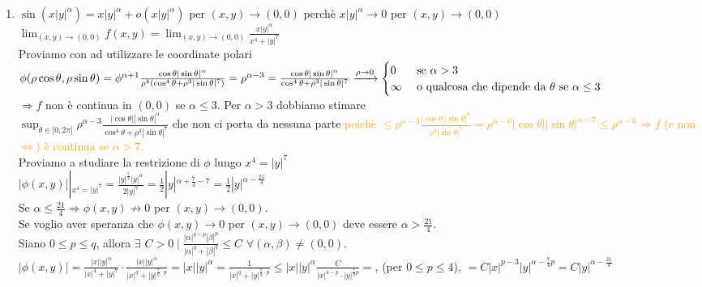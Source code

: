\documentclass{article}
\begin{document}
\begin{enumerate}
    \item $\sin(x|y|^\alpha)=x|y|^\alpha+o(x|y|^\alpha)$ per $(x,y)\rightarrow (0,0)$ perchè $x|y|^\alpha \rightarrow 0 $ per $(x,y)\rightarrow (0,0)$\\
    $\lim_{(x,y)\rightarrow(0,0)}f(x,y)=\lim_{(x,y)\rightarrow(0,0)}\frac{x|y|^\alpha}{x^4+|y|^7}$\\
    Proviamo con ad utilizzare le coordinate polari \\
    $\phi(\rho\cos\theta,\rho\sin\theta)=\phi^{\alpha+1}\frac{\cos\theta|\sin \theta|^\alpha}{\rho^4(\cos^4\theta+\rho^3|\sin\theta|^7)}=\rho^{\alpha-3}=\frac{\cos\theta|\sin\theta|^\alpha}{\cos^4\theta+\rho^3|\sin\theta|^7} \\
    \xrightarrow{\rho \rightarrow 0} \begin{cases}
        0& \text{  se  } \alpha > 3\\ 
        \infty& \text{  o qualcosa che dipende da }\theta \text{  se  } \alpha \leq 3
     \end{cases}$\\
     $\Rightarrow f$ non è continua in $(0,0)$ se $\alpha \leq 3$. Per $\alpha > 3 $ dobbiamo stimare\\
     $\sup_{\theta \in [0,2\pi[}\rho^{\alpha-3}\frac{|\cos\theta||\sin\theta|^\alpha}{\cos^4\theta+\rho^3|\sin\theta|^7}$ che non ci porta da nessuna parte \textcolor{orange}{poichè $\leq \rho^{\alpha-3}\frac{|\cos\theta||\sin\theta|^\alpha}{\rho^3|\sin\theta|^7}=\rho^{\alpha-6}|\cos\theta||\sin\theta|^{\alpha-7}\leq \rho^{\alpha-6}\Rightarrow f$ (e non $\Leftrightarrow$) è continua se $\alpha>7$.}\\
     Proviamo a studiare la restrizione di $\phi$ lungo $x^4 =|y|^7$\\
     $|\phi(x,y)||_{x^4=|y|^7} = \frac{|y|^{\frac{7}{4}} |y|^\alpha}{2|y|^7}=\frac{1}{2}|y|^{\alpha +\frac{7}{4}-7}=\frac{1}{2}|y|^{\alpha-\frac{21}{4}}$\\
     Se $\alpha \leq \frac{21}{4} \Rightarrow \phi(x,y) \nrightarrow 0$ per $(x,y)\rightarrow(0,0)$.\\
     Se voglio aver speranza che $\phi(x,y)\rightarrow 0$ per $(x,y)\rightarrow(0,0)$ deve essere $\alpha > \frac{21}{4}$.\\
     Siano $0 \leq p \leq q$, allora $\exists\,\, C >0 \mid \frac{|\alpha|^{q-p}|\beta|^p}{|\alpha|^q+|\beta|^q}\leq C\,\, \forall (\alpha,\beta)\neq(0,0)$.\\
     $|\phi(x,y)|=\frac{|x||y|^\alpha}{|x|^4+|y|^7}\cdot\frac{|x||y|^\alpha}{|x|^q+|y|^{\frac{7}{q}\cdot p}}=|x||y|^\alpha=\frac{1}{|x|^q+|y|^{\frac{7}{q}\cdot p}}\leq |x||y|^\alpha \frac{C}{|x|^{4-p}\cdot |y|^{\frac{7}{q}p}}=$, (per $0 \leq p \leq 4$), $= C|x|^{p-3}|y|^{\alpha-\frac{7}{4}p}=C|y|^{\alpha-\frac{21}{4}}$\\

\end{enumerate}
\end{document}
